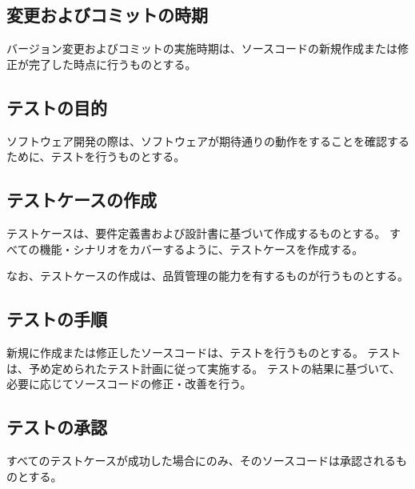 \subsection{変更およびコミットの時期}
バージョン変更およびコミットの実施時期は、ソースコードの新規作成または修正が完了した時点に行うものとする。



\clearpage

\subsection{テストの目的}
ソフトウェア開発の際は、ソフトウェアが期待通りの動作をすることを確認するために、テストを行うものとする。

\subsection{テストケースの作成}
テストケースは、要件定義書および設計書に基づいて作成するものとする。
すべての機能・シナリオをカバーするように、テストケースを作成する。

なお、テストケースの作成は、品質管理の能力を有するものが行うものとする。

\subsection{テストの手順}
新規に作成または修正したソースコードは、テストを行うものとする。
テストは、予め定められたテスト計画に従って実施する。
テストの結果に基づいて、必要に応じてソースコードの修正・改善を行う。

\subsection{テストの承認}
すべてのテストケースが成功した場合にのみ、そのソースコードは承認されるものとする。

